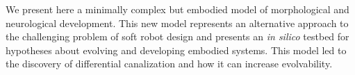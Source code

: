 We present here a minimally complex but embodied model of morphological and neurological development.
This new model represents an alternative approach to the challenging problem of soft robot design and presents an \textit{in silico} testbed for hypotheses about evolving and developing embodied systems.
This model led to the discovery of differential canalization and how it can increase evolvability.


